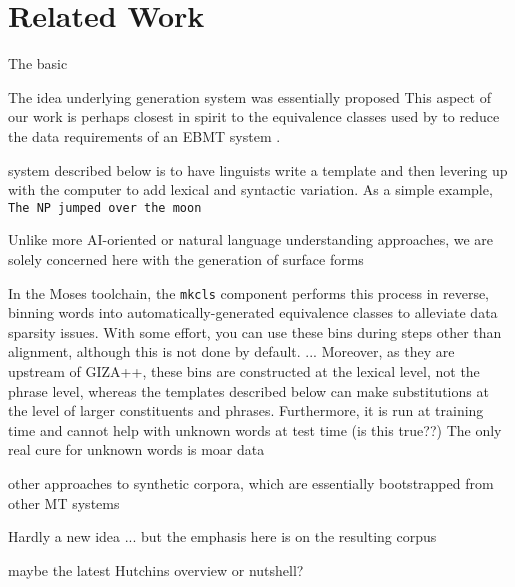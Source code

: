 \section{Related Work}
\label{sec:related}

The basic 

The idea underlying generation system was essentially proposed 
This aspect of our work is perhaps closest in spirit to the equivalence classes used by  to reduce the data requirements of an EBMT system .

system described below is to have linguists write a template and then levering up with the computer to add lexical and syntactic variation.  
As a simple example, 
{\small \tt The NP jumped over the moon}





Unlike more AI-oriented or natural language understanding approaches, we are solely concerned here with the generation of surface forms





In the Moses toolchain, the {\small \tt mkcls} component  performs this process in reverse, binning words into automatically-generated equivalence classes to alleviate data sparsity issues.
With some effort, you can use these bins during steps other than alignment, although this is not done by default.
...
Moreover, as they are upstream of GIZA++, these bins are constructed at the lexical level, not the phrase level, whereas the templates described below can make substitutions at the level of larger constituents and phrases.
Furthermore, it is run at training time and cannot help with unknown words at test time (is this true??)
The only real cure for unknown words is moar data










other approaches to synthetic corpora, which are essentially bootstrapped from other MT systems

Hardly a new idea ... but the emphasis here is on the resulting corpus





maybe the latest Hutchins overview or nutshell?


